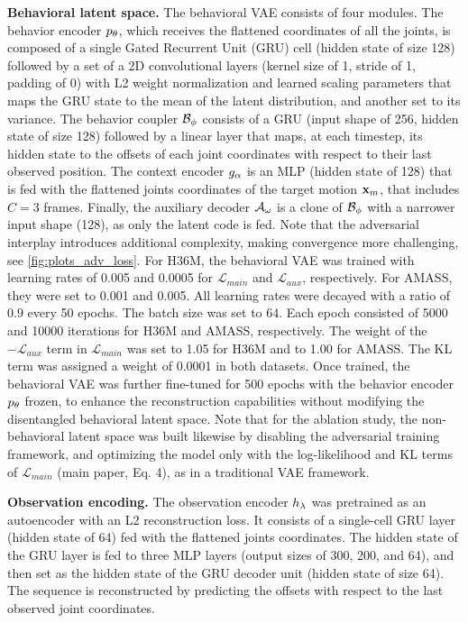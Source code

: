 \documentclass[10pt,twocolumn,letterpaper]{article}
\begin{document}
\textbf{Behavioral latent space.}
The behavioral VAE consists of four modules. The behavior encoder $p_{\theta}{}$, which receives the flattened coordinates of all the joints, is composed of a single Gated Recurrent Unit (GRU) cell (hidden state of size 128) followed by a set of a 2D convolutional layers (kernel size of 1, stride of 1, padding of 0) with L2 weight normalization and learned scaling parameters that maps the GRU state to the mean of the latent distribution, and another set to its variance. The behavior coupler $\mathcal{B}_{\phi}{}$ consists of a GRU (input shape of 256, hidden state of size 128) followed by a linear layer that maps, at each timestep, its hidden state to the offsets of each joint coordinates with respect to their last observed position. The context encoder $g_{\alpha}{}$ is an MLP (hidden state of 128) that is fed with the flattened joints coordinates of the target motion $\mathbf{x}_{m}$, that includes $C{=}3$ frames. 
Finally, the auxiliary decoder $\mathcal{A}_{\omega}{}$ is a clone of $\mathcal{B}_{\phi}{}$ with a narrower input shape (128), as only the latent code is fed. Note that the adversarial interplay introduces additional complexity, making convergence more challenging, see \autoref{fig:plots_adv_loss}.
For H36M, the behavioral VAE was trained with learning rates of 0.005 and 0.0005 for $\mathcal{L}_{main}$ and $\mathcal{L}_{aux}$, respectively. For AMASS, they were set to 0.001 and 0.005. All learning rates were decayed with a ratio of 0.9 every 50 epochs. The batch size was set to 64. Each epoch consisted of 5000 and 10000 iterations for H36M and AMASS, respectively. The weight of the $-\mathcal{L}_{aux}$ term in $\mathcal{L}_{main}$ was set to 1.05 for H36M and to 1.00 for AMASS. The KL term was assigned a weight of 0.0001 in both datasets.
Once trained, the behavioral VAE was further fine-tuned for 500 epochs with the behavior encoder $p_{\theta}{}$ frozen, to enhance the reconstruction capabilities without modifying the disentangled behavioral latent space.
Note that for the ablation study, the non-behavioral latent space was built likewise by disabling the adversarial training framework, and optimizing the model only with the log-likelihood and KL terms of $\mathcal{L}_{main}$ (main paper, Eq. 4), as in a traditional VAE framework.

\textbf{Observation encoding. }The observation encoder $h_{\lambda}{}$ was pretrained as an autoencoder with an L2 reconstruction loss. It consists of a single-cell GRU layer (hidden state of 64) fed with the flattened joints coordinates. The hidden state of the GRU layer is fed to three MLP layers (output sizes of 300, 200, and 64), and then set as the hidden state of the GRU decoder unit (hidden state of size 64). The sequence is reconstructed by predicting the offsets with respect to the last observed joint coordinates.
\end{document}
